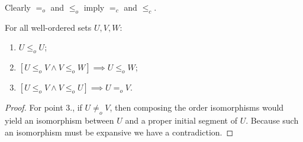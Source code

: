 Clearly $=_o$ and $\leq_o$ imply $=_c$ and $\leq_c$.

\begin{lemma} \label{preorderingWosets}
For all well-ordered sets $U,V,W$:
\begin{enumerate}
\item $U \leq_o U$;
\item $[U\leq_o V \land V\leq_o W] \implies U\leq_o W$;
\item $[U \leq_o V \land V \leq_o U] \implies U =_o V$.
\end{enumerate}
\end{lemma}
\begin{proof}
For point 3., if $U \neq_o V$, then composing the order isomorphisms would yield an isomorphism between $U$ and a proper initial segment of $U$. Because such an isomorphism must be expansive we have a contradiction.
\end{proof}

